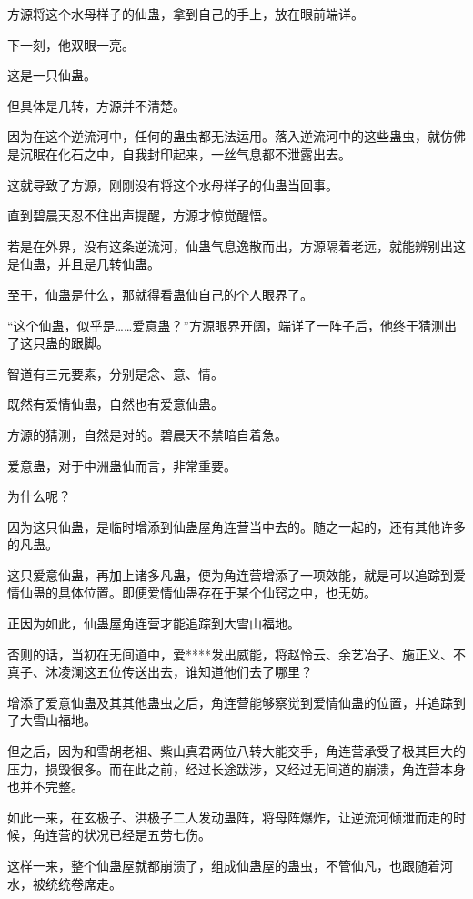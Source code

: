 
\begin{this_body}

方源将这个水母样子的仙蛊，拿到自己的手上，放在眼前端详。

下一刻，他双眼一亮。

这是一只仙蛊。

但具体是几转，方源并不清楚。

因为在这个逆流河中，任何的蛊虫都无法运用。落入逆流河中的这些蛊虫，就仿佛是沉眠在化石之中，自我封印起来，一丝气息都不泄露出去。

这就导致了方源，刚刚没有将这个水母样子的仙蛊当回事。

直到碧晨天忍不住出声提醒，方源才惊觉醒悟。

若是在外界，没有这条逆流河，仙蛊气息逸散而出，方源隔着老远，就能辨别出这是仙蛊，并且是几转仙蛊。

至于，仙蛊是什么，那就得看蛊仙自己的个人眼界了。

“这个仙蛊，似乎是……爱意蛊？”方源眼界开阔，端详了一阵子后，他终于猜测出了这只蛊的跟脚。

智道有三元要素，分别是念、意、情。

既然有爱情仙蛊，自然也有爱意仙蛊。

方源的猜测，自然是对的。碧晨天不禁暗自着急。

爱意蛊，对于中洲蛊仙而言，非常重要。

为什么呢？

因为这只仙蛊，是临时增添到仙蛊屋角连营当中去的。随之一起的，还有其他许多的凡蛊。

这只爱意仙蛊，再加上诸多凡蛊，便为角连营增添了一项效能，就是可以追踪到爱情仙蛊的具体位置。即便爱情仙蛊存在于某个仙窍之中，也无妨。

正因为如此，仙蛊屋角连营才能追踪到大雪山福地。

否则的话，当初在无间道中，爱****发出威能，将赵怜云、余艺冶子、施正义、不真子、沐凌澜这五位传送出去，谁知道他们去了哪里？

增添了爱意仙蛊及其其他蛊虫之后，角连营能够察觉到爱情仙蛊的位置，并追踪到了大雪山福地。

但之后，因为和雪胡老祖、紫山真君两位八转大能交手，角连营承受了极其巨大的压力，损毁很多。而在此之前，经过长途跋涉，又经过无间道的崩溃，角连营本身也并不完整。

如此一来，在玄极子、洪极子二人发动蛊阵，将母阵爆炸，让逆流河倾泄而走的时候，角连营的状况已经是五劳七伤。

这样一来，整个仙蛊屋就都崩溃了，组成仙蛊屋的蛊虫，不管仙凡，也跟随着河水，被统统卷席走。


\end{this_body}
